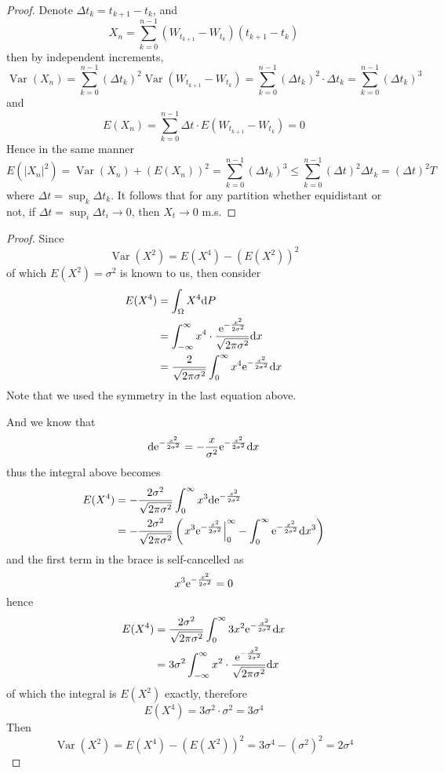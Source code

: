 \documentclass{homework}
\DeclareMathOperator{\var}{Var}
\begin{document}
    \problem
    \begin{proof}
        Denote $\Delta t_k=t_{k+1}-t_k$, and
        \[X_n=\sum_{k=0}^{n-1}(W_{t_{k+1}}-W_{t_k})(t_{k+1}-t_k)\]
        then by independent increments,
        \[\var(X_n)
        =\sum_{k=0}^{n-1}(\Delta t_k)^2\var(W_{t_{k+1}}-W_{t_k})
        =\sum_{k=0}^{n-1}(\Delta t_k)^2\cdot\Delta t_k
        =\sum_{k=0}^{n-1}(\Delta t_k)^3\]
        and 
        \[E(X_n)=\sum_{k=0}^{n-1}\Delta t\cdot E(W_{t_{k+1}}-W_{t_k})
        =0\]
        Hence in the same manner
        \[E(|X_n|^2)=\var(X_n)+(E(X_n))^2=\sum_{k=0}^{n-1}(\Delta t_k)^3
        \leq\sum_{k=0}^{n-1}(\Delta t)^2\Delta t_k
        =(\Delta t)^2 T\]
        where $\Delta t=\sup_{k}\Delta t_k$.
        It follows that
        for any partition whether equidistant or not,
        if $\Delta t=\sup_i\Delta t_i\to 0$,
        then $X_t\to 0$ m.s.
    \end{proof}

    \problem
    \newcommand{\epower}{\e^{-\frac{x^2}{2\sigma^2}}}
    \newcommand{\const}{\sqrt{2\pi\sigma^2}}
    \begin{proof}
        Since
        \[\var(X^2)=E(X^4)-(E(X^2))^2\]
        of which $E(X^2)=\sigma^2$ is known to us,
        then consider
        \[\begin{aligned}
            E(X^4)&=\int_{\Omega}X^4\diff P\\
            &=\int_{-\infty}^\infty x^4\cdot
            \frac{\epower}{\const}\diff x\\
            &=\frac{2}{\const}\int_0^\infty x^4\epower\diff x
        \end{aligned}\]
        Note that we used the symmetry in the last equation above.

        And we know that
        \[\diff \epower=-\frac{x}{\sigma^2}\epower\diff x\]
        thus the integral above becomes
        \[\begin{aligned}
            E(X^4)&=-\frac{2\sigma^2}{\const}\int_0^\infty x^3\diff\epower\\
            &=-\frac{2\sigma^2}{\const}\left(\left.x^3\epower\right|^\infty_0
            -\int_0^\infty\epower\diff x^3\right)
        \end{aligned}\]
        and the first term in the brace is self-cancelled as
        \[x^3\epower=0\]
        hence
        \[\begin{aligned}
            E(X^4)&=\frac{2\sigma^2}{\const}\int_0^\infty 3x^2\epower\diff x\\
            &=3\sigma^2\int_{-\infty}^\infty x^2\cdot\frac{\epower}{\const}\diff x
        \end{aligned}\]
        of which the integral is $E(X^2)$ exactly, therefore
        \[E(X^4)=3\sigma^2\cdot \sigma^2=3\sigma^4\]
        Then
        \[\var(X^2)=E(X^4)-(E(X^2))^2=3\sigma^4-(\sigma^2)^2=2\sigma^4\]
    \end{proof}
\end{document}
